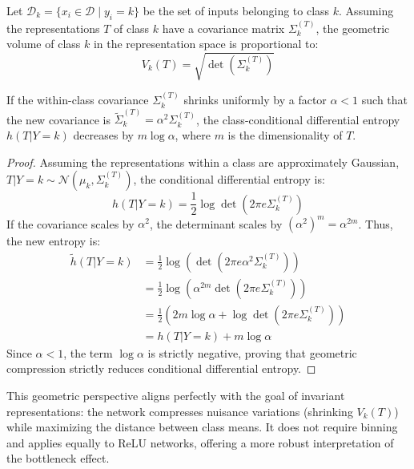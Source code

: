 \begin{definition}
Let $\mathcal{D}_k = \{x_i \in \mathcal{D} \mid y_i = k\}$ be the set of inputs belonging to class $k$. Assuming the representations $T$ of class $k$ have a covariance matrix $\Sigma_k^{(T)}$, the geometric volume of class $k$ in the representation space is proportional to:
\[
V_k(T) = \sqrt{\det(\Sigma_k^{(T)})}
\]
\end{definition}

\begin{proposition}
If the within-class covariance $\Sigma_k^{(T)}$ shrinks uniformly by a factor $\alpha < 1$ such that the new covariance is $\tilde{\Sigma}_k^{(T)} = \alpha^2 \Sigma_k^{(T)}$, the class-conditional differential entropy $h(T|Y=k)$ decreases by $m \log \alpha$, where $m$ is the dimensionality of $T$.
\end{proposition}

\begin{proof}
Assuming the representations within a class are approximately Gaussian, $T|Y=k \sim \mathcal{N}(\mu_k, \Sigma_k^{(T)})$, the conditional differential entropy is:
\[
h(T|Y=k) = \frac{1}{2} \log \det(2\pi e \Sigma_k^{(T)})
\]
If the covariance scales by $\alpha^2$, the determinant scales by $(\alpha^2)^m = \alpha^{2m}$. Thus, the new entropy is:
\begin{align*}
\tilde{h}(T|Y=k) &= \frac{1}{2} \log \left( \det(2\pi e \alpha^2 \Sigma_k^{(T)}) \right) \\
&= \frac{1}{2} \log \left( \alpha^{2m} \det(2\pi e \Sigma_k^{(T)}) \right) \\
&= \frac{1}{2} \left( 2m \log \alpha + \log \det(2\pi e \Sigma_k^{(T)}) \right) \\
&= h(T|Y=k) + m \log \alpha
\end{align*}
Since $\alpha < 1$, the term $\log \alpha$ is strictly negative, proving that geometric compression strictly reduces conditional differential entropy.
\end{proof}

This geometric perspective aligns perfectly with the goal of invariant representations: the network compresses nuisance variations (shrinking $V_k(T)$) while maximizing the distance between class means. It does not require binning and applies equally to ReLU networks, offering a more robust interpretation of the bottleneck effect.

